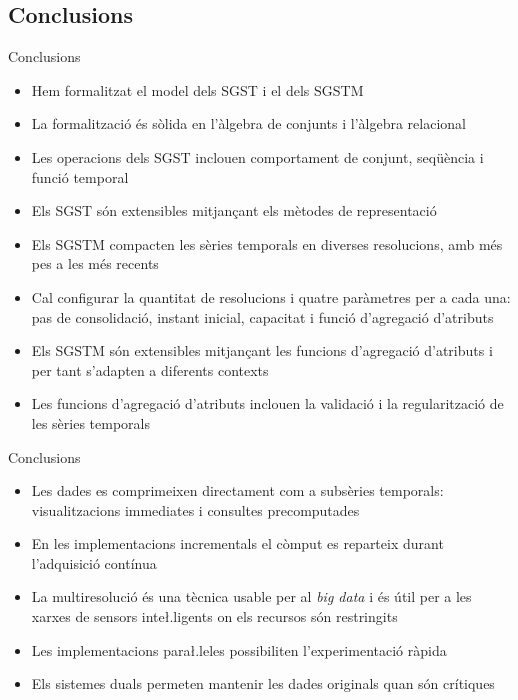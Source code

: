 \subsection*{Conclusions}
\begin{frame}{Conclusions}

  \begin{itemize}
  \item Hem formalitzat el model dels SGST i el dels SGSTM
  \item La formalització és sòlida en l’àlgebra de conjunts i l’àlgebra relacional

  \item Les operacions dels SGST inclouen comportament de conjunt,
    seqüència i funció temporal
\item Els SGST són extensibles mitjançant els mètodes de representació
\item Els SGSTM compacten les sèries temporals en diverses resolucions, amb més pes a les més recents
\item Cal configurar la quantitat de resolucions i quatre paràmetres per a cada una: pas de consolidació, instant inicial, capacitat i funció d’agregació d’atributs
\item Els SGSTM són extensibles mitjançant les funcions d’agregació d’atributs i per tant s’adapten a diferents contexts
\item Les funcions d’agregació d’atributs inclouen la validació i la regularització de les sèries temporals

  \end{itemize}


\end{frame}

\begin{frame}{Conclusions}
  \begin{itemize}
\item Les dades es comprimeixen directament com a subsèries temporals: visualitzacions immediates i consultes precomputades
\item En les implementacions incrementals el còmput es reparteix durant l’adquisició contínua
\item La multiresolució és una tècnica usable per al \emph{big data} i és útil per a les xarxes de sensors inte\l.ligents on els recursos són restringits
\item Les implementacions para\l.leles possibiliten l’experimentació ràpida
\item Els sistemes duals permeten mantenir les dades originals quan són crítiques
  \end{itemize}
\end{frame}


